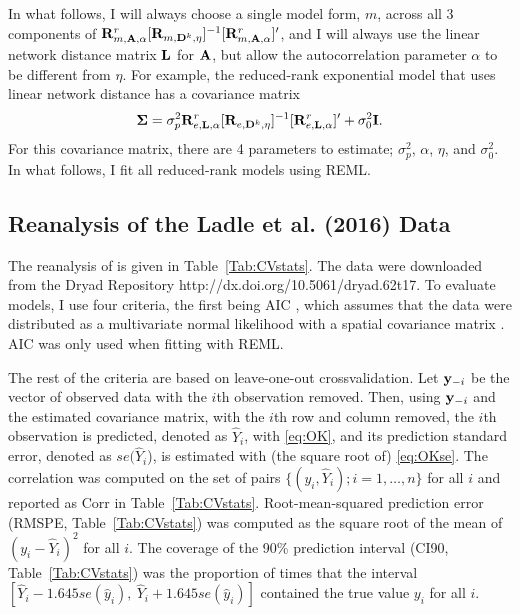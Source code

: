 \documentclass[11pt, titlepage]{article}\usepackage[]{graphicx}\usepackage[]{color}
\begin{document}
\begin{spacing}{1.9}
\begin{flushleft}
\begin{enumerate}
\end{enumerate}

In what follows, I will always choose a single model form, $m$, across all 3 components of $\mathbf{R}^r_{m,\mathbf{A},\alpha}[\mathbf{R}_{m,\mathbf{D}^k,\eta}]^{-1}[\mathbf{R}^r_{m,\mathbf{A},\alpha}]^{\prime}$, and I will always use the linear network distance matrix $\mathbf{L}$ for $\mathbf{A}$, but allow the autocorrelation parameter $\alpha$ to be different from $\eta$.  For example, the reduced-rank exponential model that uses linear network distance has a covariance matrix
\begin{equation} \label{eq:RRmodCov}
				\mbox{\boldmath $\Sigma$} = \sigma^2_p\mathbf{R}^r_{e,\mathbf{L},\alpha}[\mathbf{R}_{e,\mathbf{D}^k,\eta}]^{-1}[\mathbf{R}^r_{e,\mathbf{L},\alpha}]^{\prime} + \sigma^2_0\mathbf{I}.
\end{equation}
For this covariance matrix, there are 4 parameters to estimate; $\sigma^2_p$, $\alpha$, $\eta$, and $\sigma^2_0$.  In what follows, I fit all reduced-rank models using REML.

\subsection*{Reanalysis of the Ladle et al. (2016) Data}

The reanalysis of \citet{Ladl:Avga:Whea:Boyc:pred:2016} is given in Table~\ref{Tab:CVstats}. The data were downloaded from the Dryad Repository http://dx.doi.org/10.5061/dryad.62t17.  To evaluate models, I use four criteria, the first being AIC \citep{Akai:Info:1973,Burn:Ande:mode:2002}, which assumes that the data were distributed as a multivariate normal likelihood with a spatial covariance matrix \citep[for an example using spatial models, see][]{Hoet:Davi:Mert:Thom:mode:2006}.  AIC was only used when fitting with REML.   

The rest of the criteria are based on leave-one-out crossvalidation.  Let $\mathbf{y}_{-i}$ be the vector of observed data with the $i$th observation removed. Then, using $\mathbf{y}_{-i}$ and the estimated covariance matrix, with the $i$th row and column removed, the $i$th observation is predicted, denoted as $\hat{Y}_i$,  with \ref{eq:OK}, and its prediction standard error, denoted as $se(\hat{Y}_i$), is estimated with (the square root of) \ref{eq:OKse}. The correlation was computed on the set of pairs $\{(y_i,\hat{Y}_i); i = 1,\ldots,n \}$ for all $i$ and reported as Corr in Table~\ref{Tab:CVstats}.  Root-mean-squared prediction error (RMSPE, Table~\ref{Tab:CVstats}) was computed as the square root of the mean of $(y_i-\hat{Y}_i)^2$ for all $i$. The coverage of the 90\% prediction interval (CI90, Table~\ref{Tab:CVstats}) was the proportion of times that the interval $[\hat{Y}_i - 1.645 se(\hat{y}_i), \ \hat{Y}_i + 1.645 se(\hat{y}_i)]$ contained the true value $y_i$ for all $i$.


\end{flushleft}
\end{spacing}
\end{document}
